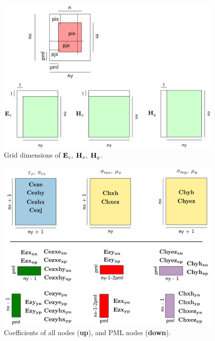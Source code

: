 \documentclass[a4paper,12pt]{article}
\begin{document}
%
\begin{figure}
\centering
\includegraphics[width=1\textwidth]{../pics/tikz/svg/EzHxHy.pdf}
\caption{Grid dimensions of ${\bf E}_z,\; {\bf H}_x,\; {\bf H}_y$.}
\end{figure}
%
\begin{figure}
\centering
\includegraphics[width=1\textwidth]{../pics/tikz/svg/coeff.pdf}
\caption{Coefficients of all nodes ({\bf up}), and PML nodes ({\bf down}).}
\end{figure}
%
\end{document}
